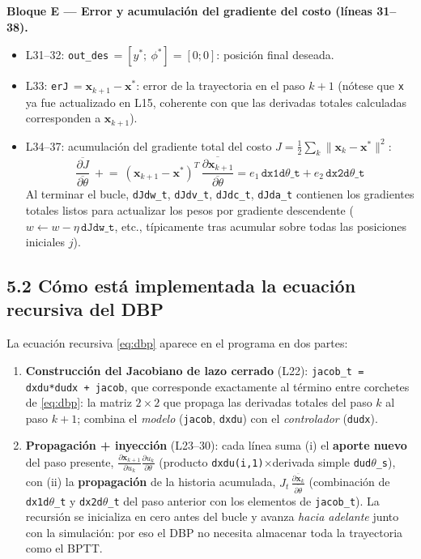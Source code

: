 \documentclass[11pt,a4paper]{article}
\newcommand{\pd}[2]{\frac{\partial #1}{\partial #2}}
\newcommand{\td}[2]{\frac{\overline{\partial #1}}{\overline{\partial #2}}}
\begin{document}
\textbf{Bloque E — Error y acumulación del gradiente del costo (líneas 31--38).}
\begin{itemize}[itemsep=1pt]
\item L31--32: \texttt{out\_des}$\,=[y^{*};\ \phi^{*}]=[0;0]$: posición final deseada.
\item L33: \texttt{erJ}$\,=\mathbf x_{k+1}-\mathbf x^{*}$: error de la trayectoria en el paso $k+1$ (nótese que \texttt{x} ya fue actualizado en L15, coherente con que las derivadas totales calculadas corresponden a $\mathbf x_{k+1}$).
\item L34--37: acumulación del gradiente total del costo $J=\frac12\sum_k\|\mathbf x_k-\mathbf x^{*}\|^2$:
\[
\td{J}{\theta}\ \mathrel{+}=\ (\mathbf x_{k+1}-\mathbf x^{*})^{T}\,\td{\mathbf x_{k+1}}{\theta}
= e_1\,\texttt{dx1d}\theta\texttt{\_t}+e_2\,\texttt{dx2d}\theta\texttt{\_t}
\]
Al terminar el bucle, \texttt{dJdw\_t}, \texttt{dJdv\_t}, \texttt{dJdc\_t}, \texttt{dJda\_t} contienen los gradientes totales listos para actualizar los pesos por gradiente descendente ($w\leftarrow w-\eta\,\texttt{dJdw\_t}$, etc., típicamente tras acumular sobre todas las posiciones iniciales $j$).
\end{itemize}

\subsection*{5.2 Cómo está implementada la ecuación recursiva del DBP}

La ecuación recursiva \eqref{eq:dbp} aparece en el programa en dos partes:
\begin{enumerate}[itemsep=2pt]
\item \textbf{Construcción del Jacobiano de lazo cerrado} (L22): \texttt{jacob\_t = dxdu*dudx + jacob}, que corresponde exactamente al término entre corchetes de \eqref{eq:dbp}: la matriz $2\times2$ que propaga las derivadas totales del paso $k$ al paso $k+1$; combina el \emph{modelo} (\texttt{jacob}, \texttt{dxdu}) con el \emph{controlador} (\texttt{dudx}).
\item \textbf{Propagación + inyección} (L23--30): cada línea suma (i) el \textbf{aporte nuevo} del paso presente, $\pd{\mathbf x_{k+1}}{u_k}\pd{u_k}{\theta}$ (producto \texttt{dxdu(i,1)}$\times$derivada simple \texttt{dud}$\theta$\texttt{\_s}), con (ii) la \textbf{propagación} de la historia acumulada, $J_t\,\td{\mathbf x_k}{\theta}$ (combinación de \texttt{dx1d}$\theta$\texttt{\_t} y \texttt{dx2d}$\theta$\texttt{\_t} del paso anterior con los elementos de \texttt{jacob\_t}). La recursión se inicializa en cero antes del bucle y avanza \emph{hacia adelante} junto con la simulación: por eso el DBP no necesita almacenar toda la trayectoria como el BPTT.
\end{enumerate}
\end{document}
